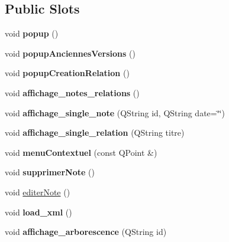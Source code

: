 \subsection*{Public Slots}
\begin{DoxyCompactItemize}
\item 
\mbox{\label{class_fen_principale_a87ca6c2647ca958c60bac70512da5899}} 
void {\bfseries popup} ()
\item 
\mbox{\label{class_fen_principale_a59e1d3d260dd7dc4bec7585695dad965}} 
void {\bfseries popup\+Anciennes\+Versions} ()
\item 
\mbox{\label{class_fen_principale_a04c6b879bd8bc7c7ddf164ce9b4273b1}} 
void {\bfseries popup\+Creation\+Relation} ()
\item 
\mbox{\label{class_fen_principale_a1e99bb2ccb692e8d084b0c667bfd364f}} 
void {\bfseries affichage\+\_\+notes\+\_\+relations} ()
\item 
\mbox{\label{class_fen_principale_a6cc4b79a54ed443cced0fb03f7f83619}} 
void {\bfseries affichage\+\_\+single\+\_\+note} (Q\+String id, Q\+String date=\char`\"{}\char`\"{})
\item 
\mbox{\label{class_fen_principale_a67e142066003277638ed8b7dc67b19e9}} 
void {\bfseries affichage\+\_\+single\+\_\+relation} (Q\+String titre)
\item 
\mbox{\label{class_fen_principale_a55596abf1539b9b6012fc89f0e9c3d6a}} 
void {\bfseries menu\+Contextuel} (const Q\+Point \&)
\item 
\mbox{\label{class_fen_principale_abdbd0250f3c3e037bfa7cd27c5162baf}} 
void {\bfseries supprimer\+Note} ()
\item 
void \hyperlink{class_fen_principale_ab8b916f06d0c149b1411781e7129fab5}{editer\+Note} ()
\item 
\mbox{\label{class_fen_principale_a60879a209bf90971f1919a685c9538dd}} 
void {\bfseries load\+\_\+xml} ()
\item 
\mbox{\label{class_fen_principale_adf2a7193704aaf0b73b5b10b3133488c}} 
void {\bfseries affichage\+\_\+arborescence} (Q\+String id)
\end{DoxyCompactItemize}
